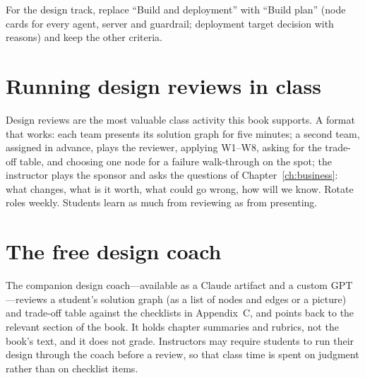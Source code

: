 For the design track, replace ``Build and deployment'' with ``Build plan'' (node cards for every agent, server and guardrail; deployment target decision with reasons) and keep the other criteria.

\section{Running design reviews in class}

Design reviews are the most valuable class activity this book supports. A format that works: each team presents its solution graph for five minutes; a second team, assigned in advance, plays the reviewer, applying W1--W8, asking for the trade-off table, and choosing one node for a failure walk-through on the spot; the instructor plays the sponsor and asks the questions of Chapter~\ref{ch:business}: what changes, what is it worth, what could go wrong, how will we know. Rotate roles weekly. Students learn as much from reviewing as from presenting.

\section{The free design coach}

The companion design coach---available as a Claude artifact and a custom GPT---reviews a student's solution graph (as a list of nodes and edges or a picture) and trade-off table against the checklists in Appendix~C, and points back to the relevant section of the book. It holds chapter summaries and rubrics, not the book's text, and it does not grade. Instructors may require students to run their design through the coach before a review, so that class time is spent on judgment rather than on checklist items.
